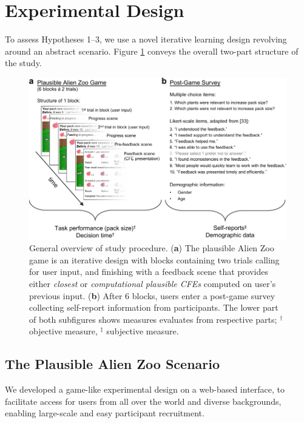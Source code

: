 \section{Experimental Design}\label{sec:experimental-design}

To assess Hypotheses 1--3, we use a novel iterative learning design revolving around an abstract scenario. Figure \ref{fig:StudyStructure} conveys the overall two-part structure of the study.

\begin{figure}
   \centering
   \includegraphics[width=\textwidth]{./media/FigureStudyStructure.pdf}
   \caption{General overview of study procedure. (\textbf{a}) The plausible Alien Zoo game is an iterative design with blocks containing two trials calling for user input, and finishing with a feedback scene that provides either \textit{closest} or \textit{computational plausible \glspl{CFE}} computed on user's previous input. (\textbf{b}) After 6 blocks, users enter a post-game survey collecting self-report information from participants. The lower part of both subfigures shows measures evaluates from respective parts; $^\dag$ objective measure, $^\ddag$ subjective measure.}
   \label{fig:StudyStructure}
 \end{figure}

\subsection{The Plausible Alien Zoo Scenario}

We developed a game-like experimental design on a web-based interface, to facilitate access for users from all over the world and diverse backgrounds, enabling large-scale and easy participant recruitment.

